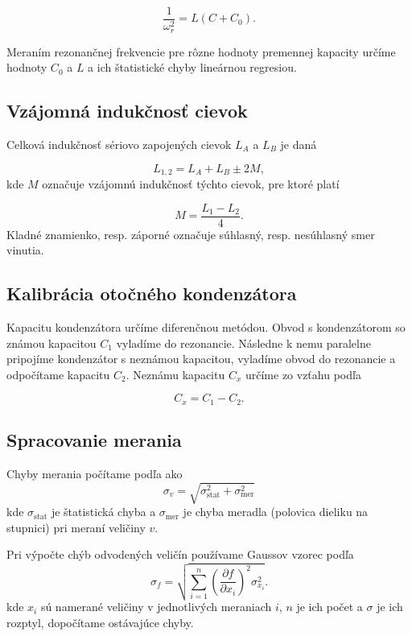\documentclass{article}
\begin{document}
\begin{equation}
    \frac{1}{{\omega}_r^2} = L(C + C_0).
\end{equation}

Meraním rezonančnej frekvencie pre rôzne hodnoty premennej kapacity určíme hodnoty $C_0$ a $L$ a ich štatistické chyby lineárnou regresiou. 
\subsection{Vzájomná indukčnosť cievok}
Celková indukčnosť sériovo zapojených cievok $L_A$ a $L_B$ je daná \cite{2}

\begin{equation}
    L_{1,2} = L_A + L_B \pm 2M,
\end{equation}
kde $M$ označuje vzájomnú indukčnosť týchto cievok, pre ktoré platí \cite{2}

\begin{equation}
    M = \frac{L_1-L_2}{4}.
\end{equation}
Kladné znamienko, resp. záporné označuje súhlasný, resp. nesúhlasný smer vinutia. 

\subsection{Kalibrácia otočného kondenzátora}
Kapacitu kondenzátora určíme diferenčnou metódou. Obvod s kondenzátorom so známou kapacitou $C_1$ vyladíme do rezonancie. Následne k nemu paralelne pripojíme kondenzátor s neznámou kapacitou, vyladíme obvod do rezonancie a odpočítame kapacitu $C_2$. Neznámu kapacitu $C_x$ určíme zo vzťahu podľa \cite{2}

\begin{equation}
    C_x = C_1 - C_2.
\end{equation}

\subsection{Spracovanie merania}
Chyby merania počítame podľa \cite{1} ako
    \begin{equation}
        \sigma_v = \sqrt{\sigma_{\text{stat}}^2 + \sigma_{\text{mer}}^2 }
    \end{equation}
    kde $\sigma_{\text{stat}}$ je štatistická chyba a $\sigma_{\text{mer}}$ je chyba meradla (polovica dieliku na stupnici) pri meraní veličiny $v$. 
    
Pri výpočte chýb odvodených veličín používame Gaussov vzorec podľa \cite{1}
    \begin{equation}
            \sigma_f = \sqrt{\sum_{i=1}^{n}\left( \frac{\partial f}{\partial x_i}\right)^2 \sigma_{x_i}^2}.
    \end{equation}
kde $x_i$ sú namerané veličiny v jednotlivých meraniach $i$, $n$ je ich počet a $\sigma$ je ich rozptyl, dopočítame ostávajúce chyby.
\end{document}
